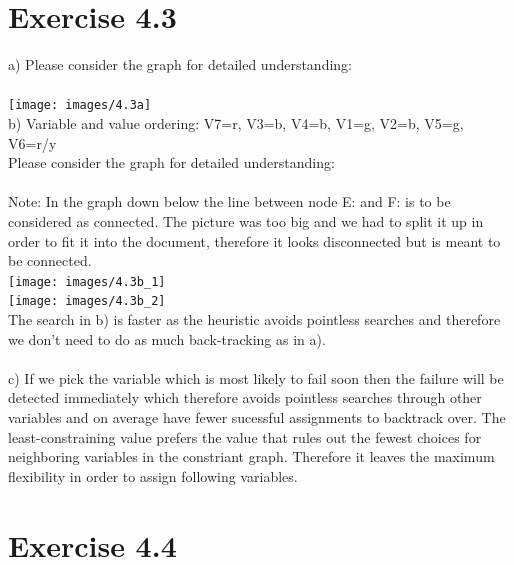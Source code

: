 \documentclass[12pt]{article}
\begin{document}
{\section*{Exercise 4.3}


a) Please consider the graph for detailed understanding:\\ \\
\texttt{[image: images/4.3a]}\\
b) Variable and value ordering: V7=r, V3=b, V4=b, V1=g, V2=b, V5=g, V6=r/y\\
Please consider the graph for detailed understanding:\\ \\
Note: In the graph down below the line between node E: and F: is to be considered as connected. The picture was too big and we had to split it up in order to fit it into the document, therefore it looks disconnected but is meant to be connected.\\
\texttt{[image: images/4.3b\_1]}\\
\texttt{[image: images/4.3b\_2]}\\
The search in b) is faster as the heuristic avoids pointless searches and therefore we don't need to do as much back-tracking as in a).\\ \\
c) If we pick the variable which is most likely to fail soon then the failure will be detected immediately which therefore avoids pointless searches through other variables and on average have fewer sucessful assignments to backtrack over. The least-constraining value prefers the value that rules out the fewest choices for neighboring variables in the constriant graph. Therefore it leaves the maximum flexibility in order to assign following variables.\\

\section*{Exercise 4.4}


}
\end{document}
